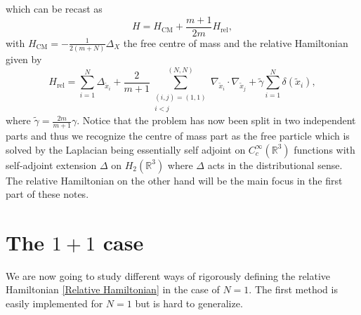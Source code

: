 \documentclass[a4paper,11pt]{article}
\begin{document}
which can be recast as \begin{equation}
H=H_{\text{CM}}+\frac{m+1}{2m}H_{\text{rel}},
\end{equation}
with $ H_{\text{CM}}=-\frac{1}{2(m+N)}\Delta_X $ the free centre of mass and the relative Hamiltonian given by \begin{equation}\label{Relative Hamiltonian}
H_{\text{rel}}=\sum_{i=1}^{N}\Delta_{\tilde{x}_i}+\frac{2}{m+1}\sum_{\substack{(i,j)=(1,1)\\i<j}}^{(N,N)}\nabla_{\tilde{x}_i}\cdot\nabla_{\tilde{x}_j}+\tilde{\gamma}\sum_{i=1}^{N}\delta(\tilde{x}_i),
\end{equation}
where $ \tilde{\gamma}=\frac{2m}{m+1}\gamma $. Notice that the problem has now been split in two independent parts and thus we recognize the centre of mass part as the free particle which is solved by the Laplacian being essentially self adjoint on $ C^\infty_c(\mathbb{R}^3) $ functions with self-adjoint extension $ \Delta $ on $ H_2(\mathbb{R}^3) $ where $ \Delta $ acts in the distributional sense. The relative Hamiltonian on the other hand will be the main focus in the first part of these notes.
\section{The $ 1+1 $ case}
We are now going to study different ways of rigorously defining the relative Hamiltonian \eqref{Relative Hamiltonian} in the case of $ N=1 $. The first method is easily implemented for $ N=1 $ but is hard to generalize.
\end{document}
